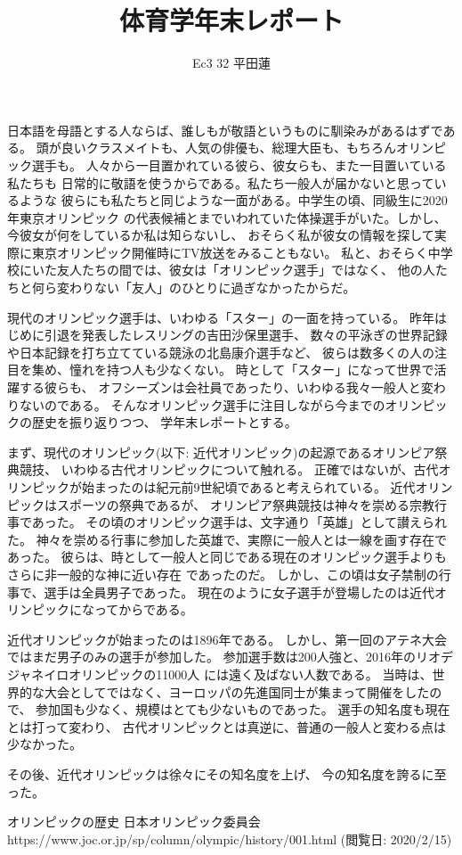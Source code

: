 \documentclass[]{jsarticle}
\title{体育学年末レポート}
\author{Ec3 32 平田蓮}
\date{}
\begin{document}
\maketitle
日本語を母語とする人ならば、誰しもが敬語というものに馴染みがあるはずである。
頭が良いクラスメイトも、人気の俳優も、総理大臣も、もちろんオリンピック選手も。
人々から一目置かれている彼ら、彼女らも、また一目置いている私たちも
日常的に敬語を使うからである。私たち一般人が届かないと思っているような
彼らにも私たちと同じような一面がある。中学生の頃、同級生に2020年東京オリンピック
の代表候補とまでいわれていた体操選手がいた。しかし、今彼女が何をしているか私は知らないし、
おそらく私が彼女の情報を探して実際に東京オリンピック開催時にTV放送をみることもない。
私と、おそらく中学校にいた友人たちの間では、彼女は「オリンピック選手」ではなく、
他の人たちと何ら変わりない「友人」のひとりに過ぎなかったからだ。

現代のオリンピック選手は、いわゆる「スター」の一面を持っている。
昨年はじめに引退を発表したレスリングの吉田沙保里選手、
数々の平泳ぎの世界記録や日本記録を打ち立てている競泳の北島康介選手など、
彼らは数多くの人の注目を集め、憧れを持つ人も少なくない。
時として「スター」になって世界で活躍する彼らも、
オフシーズンは会社員であったり、いわゆる我々一般人と変わりないのである。
そんなオリンピック選手に注目しながら今までのオリンピックの歴史を振り返りつつ、
学年末レポートとする。

まず、現代のオリンピック(以下: 近代オリンピック)の起源であるオリンピア祭典競技、
いわゆる古代オリンピックについて触れる。
正確ではないが、古代オリンピックが始まったのは紀元前9世紀頃であると考えられている。
\cite{history}
近代オリンピックはスポーツの祭典であるが、
オリンピア祭典競技は神々を崇める宗教行事であった。
その頃のオリンピック選手は、文字通り「英雄」として讃えられた。
神々を崇める行事に参加した英雄で、実際に一般人とは一線を画す存在であった。
彼らは、時として一般人と同じである現在のオリンピック選手よりもさらに非一般的な神に近い存在
であったのだ。
しかし、この頃は女子禁制の行事で、選手は全員男子であった。
現在のように女子選手が登場したのは近代オリンピックになってからである。

近代オリンピックが始まったのは1896年である。
しかし、第一回のアテネ大会ではまだ男子のみの選手が参加した。
参加選手数は200人強と、2016年のリオデジャネイロオリンピックの11000人
には遠く及ばない人数である。
当時は、世界的な大会としてではなく、ヨーロッパの先進国同士が集まって開催をしたので、
参加国も少なく、規模はとても少ないものであった。
選手の知名度も現在とは打って変わり、
古代オリンピックとは真逆に、普通の一般人と変わる点は少なかった。

その後、近代オリンピックは徐々にその知名度を上げ、
今の知名度を誇るに至った。

\begin{thebibliography}{99}
     オリンピックの歴史 日本オリンピック委員会 \\
        https://www.joc.or.jp/sp/column/olympic/history/001.html
        (閲覧日: 2020/2/15)
\end{thebibliography}
\end{document}
